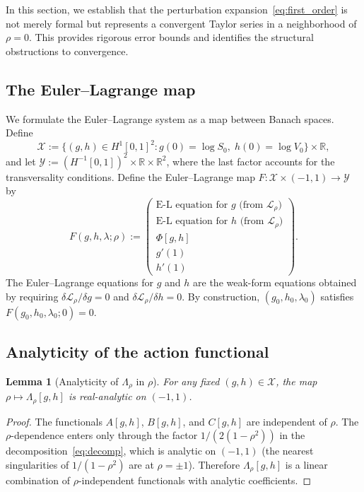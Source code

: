\documentclass[11pt]{article}
\newtheorem{lemma}[theorem]{Lemma}
\theoremstyle{definition}
\newcommand{\R}{\mathbb{R}}
\newcommand{\Hone}{H^1}
\begin{document}
In this section, we establish that the perturbation expansion~\eqref{eq:first_order} is not merely formal but represents a convergent Taylor series in a neighborhood of $\rho = 0$. This provides rigorous error bounds and identifies the structural obstructions to convergence.

\subsection{The Euler--Lagrange map}\label{sec:EL_map}

We formulate the Euler--Lagrange system as a map between Banach spaces. Define
\begin{equation}
  \mathcal{X} := \{(g,h) \in \Hone[0,1]^2 : g(0) = \log S_0,\; h(0) = \log V_0\} \times \R,
\end{equation}
and let $\mathcal{Y} := (H^{-1}[0,1])^2 \times \R \times \R^2$, where the last factor accounts for the transversality conditions. Define the Euler--Lagrange map $F: \mathcal{X} \times (-1,1) \to \mathcal{Y}$ by
\begin{equation}\label{eq:EL_map}
  F(g, h, \lambda; \rho) :=
  \begin{pmatrix}
    \text{E-L equation for } g \text{ (from } \mathcal{L}_\rho) \\
    \text{E-L equation for } h \text{ (from } \mathcal{L}_\rho) \\
    \Phi[g,h] \\
    g'(1) \\
    h'(1)
  \end{pmatrix}.
\end{equation}
The Euler--Lagrange equations for $g$ and $h$ are the weak-form equations obtained by requiring $\delta\mathcal{L}_\rho/\delta g = 0$ and $\delta\mathcal{L}_\rho/\delta h = 0$. By construction, $(g_0, h_0, \lambda_0)$ satisfies $F(g_0, h_0, \lambda_0; 0) = 0$.

\subsection{Analyticity of the action functional}

\begin{lemma}[Analyticity of $\Lambda_\rho$ in $\rho$]\label{lem:Lambda_analytic}
For any fixed $(g,h) \in \mathcal{X}$, the map $\rho \mapsto \Lambda_\rho[g,h]$ is real-analytic on $(-1,1)$.
\end{lemma}

\begin{proof}
The functionals $A[g,h]$, $B[g,h]$, and $C[g,h]$ are independent of $\rho$. The $\rho$-dependence enters only through the factor $1/(2(1-\rho^2))$ in the decomposition~\eqref{eq:decomp}, which is analytic on $(-1,1)$ (the nearest singularities of $1/(1-\rho^2)$ are at $\rho = \pm 1$). Therefore $\Lambda_\rho[g,h]$ is a linear combination of $\rho$-independent functionals with analytic coefficients.
\end{proof}
\end{document}

